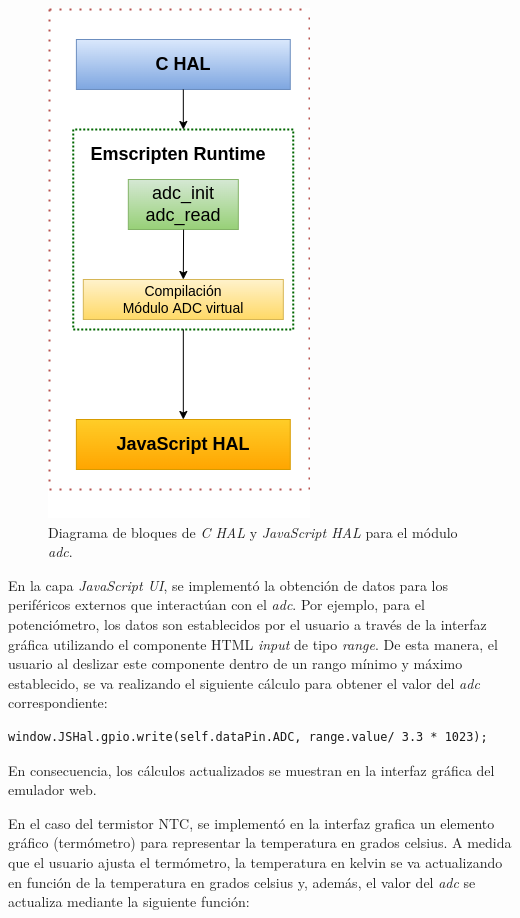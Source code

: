 \begin{figure}[ht]
	\centering
	\includegraphics[scale=.53]{./Figures/adcEmscripten.png}
	\caption{Diagrama de bloques de \textit{C HAL} y \textit{JavaScript HAL} para el módulo \textit{adc}.}
	\label{fig:adcEmscripten}
\end{figure}

En la capa \textit{JavaScript UI}, se implementó la obtención de datos para los periféricos externos que interactúan con el \textit{adc}. Por ejemplo, para el potenciómetro, los datos son establecidos por el usuario a través de la interfaz gráfica utilizando el componente HTML  \textit{input} de tipo \textit{range}. De esta manera, el usuario al deslizar este componente dentro de un rango mínimo y máximo establecido, se va realizando el siguiente cálculo para obtener el valor del \textit{adc} correspondiente:

\begin{lstlisting}[caption={Cálculo del ADC para el potenciómetro.}]
  window.JSHal.gpio.write(self.dataPin.ADC, range.value/ 3.3 * 1023);
\end{lstlisting}

En consecuencia, los cálculos actualizados se muestran en la interfaz gráfica del emulador web.

En el caso del termistor NTC, se implementó en la interfaz grafica un elemento gráfico (termómetro) para representar la temperatura en grados celsius. A medida que el usuario ajusta el termómetro, la temperatura en kelvin se va actualizando en función de la temperatura en grados celsius y, además, el valor del \textit{adc} se actualiza mediante la siguiente función:

